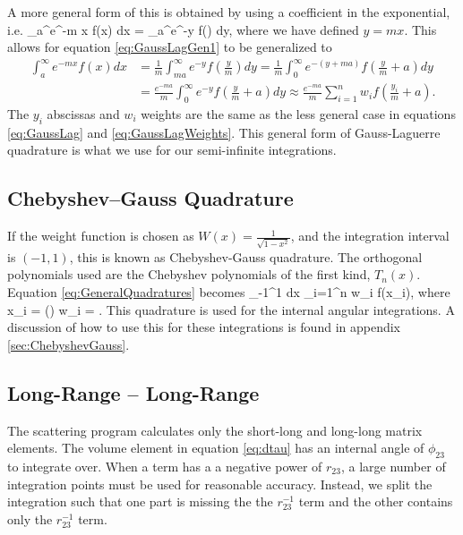 \documentclass[Dissertation.tex]{subfiles}
\begin{document}
\noindent A more general form of this is obtained by using a coefficient in the exponential, i.e.
\beq
\label{eq:GaussLagGen2}
\int_a^\infty e^{-m x} f(x) dx =  \int_a^\infty e^{-y} f\left(\right) dy,
\eeq
where we have defined $y = m x$.  This allows for equation \ref{eq:GaussLagGen1} to be generalized to
\begin{align}
\label{eq:GaussLagGen}
\nonumber \int_a^\infty e^{-m x} f(x) dx &= \frac{1}{m} \int_{ma}^\infty e^{-y} f\left(\frac{y}{m}\right) dy = \frac{1}{m} \int_0^\infty e^{-(y+ma)} f\left(\frac{y}{m}+a\right) dy \\
& = \frac{e^{-ma}}{m} \int_0^\infty e^{-y} f\left(\frac{y}{m}+a\right) dy \approx \frac{e^{-ma}}{m} \sum_{i=1}^n w_i f\left(\frac{y_i}{m}+a\right).
\end{align}
The $y_i$ abscissas and $w_i$ weights are the same as the less general case in equations \ref{eq:GaussLag} and \ref{eq:GaussLagWeights}.  This general form of Gauss-Laguerre quadrature is what we use for our semi-infinite integrations.


\subsection{Chebyshev--Gauss Quadrature}
\label{sec:ChebyshevGauss1}
If the weight function is chosen as $W(x)=\frac{1}{\sqrt{1-x^2}}$, and the integration interval is $(-1,1)$, this is known as Chebyshev-Gauss quadrature. The orthogonal polynomials used are the Chebyshev polynomials of the first kind, $T_n(x)$.  Equation \ref{eq:GeneralQuadratures} becomes
\beq
\label{eq:GaussCheb}
\int_{-1}^1  dx \approx \sum_{i=1}^n w_i f(x_i),
\eeq
where
\beq
\label{eq:GaussChebAbsWeights}
x_i = \cos\left(\pi\right)  w_i = .
\eeq
This quadrature is used for the internal angular integrations.  A discussion of how to use this for these integrations is found in appendix \ref{sec:ChebyshevGauss}.

\subsection{Long-Range -- Long-Range}
\label{sec:LongLongInt}

The scattering program calculates only the short-long and long-long matrix elements. The volume element in equation \ref{eq:dtau} has an internal angle of $\phi_{23}$ to integrate over.  When a term has a a negative power of $r_{23}$, a large number of integration points must be used for reasonable accuracy. Instead, we split the integration such that one part is missing the the $r_{23}^{-1}$ term and the other contains only the $r_{23}^{-1}$ term.
\end{document}
